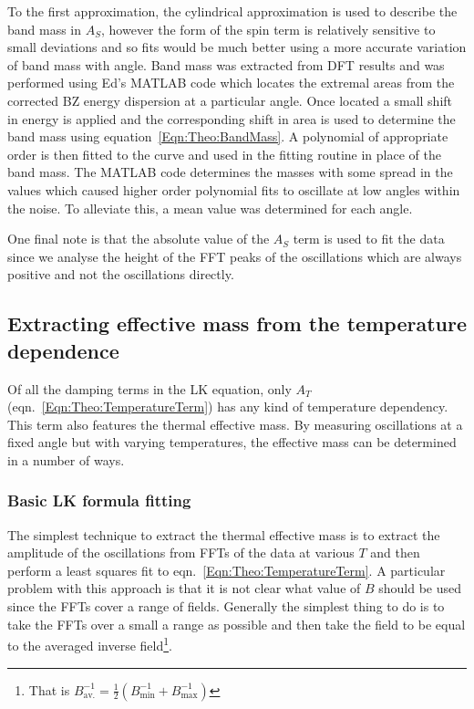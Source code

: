 To the first approximation, the cylindrical approximation is used to describe the band mass in $A_S$, however the form of the spin term is relatively sensitive to small deviations and so fits would be much better using a more accurate variation of band mass with angle. Band mass was extracted from \ac{DFT} results and was performed using Ed's MATLAB code which locates the extremal areas from the corrected \ac{BZ} energy dispersion at a particular angle. Once located a small shift in energy is applied and the corresponding shift in area is used to determine the band mass using equation~\ref{Eqn:Theo:BandMass}. A polynomial of appropriate order is then fitted to the curve and used in the fitting routine in place of the band mass. The MATLAB code determines the masses with some spread in the values which caused higher order polynomial fits to oscillate at low angles within the noise. To alleviate this, a mean value was determined for each angle.

One final note is that the absolute value of the $A_S$ term is used to fit the data since we analyse the height of the \ac{FFT} peaks of the oscillations which are always positive and not the oscillations directly.

\subsection{Extracting effective mass from the temperature dependence}
\label{Sec:Exp:ExtractingEffMassTemperatureDependence}

Of all the damping terms in the \ac{LK} equation, only $A_T$ (eqn.~\ref{Eqn:Theo:TemperatureTerm}) has any kind of temperature dependency. This term also features the thermal effective mass. By measuring oscillations at a fixed angle but with varying temperatures, the effective mass can be determined in a number of ways.

\subsubsection{Basic \ac{LK} formula fitting}

The simplest technique to extract the thermal effective mass is to extract the amplitude of the oscillations from \acp{FFT} of the data at various $T$ and then perform a least squares fit to eqn.~\ref{Eqn:Theo:TemperatureTerm}. A particular problem with this approach is that it is not clear what value of $B$ should be used since the \acp{FFT} cover a range of fields. Generally the simplest thing to do is to take the \acp{FFT} over a small a range as possible and then take the field to be equal to the averaged inverse field\footnote{That is $B_{\textrm{av.}}^{-1} = \frac{1}{2}(B_{\textrm{min}}^{-1} + B_{\textrm{max}}^{-1})$}. 

